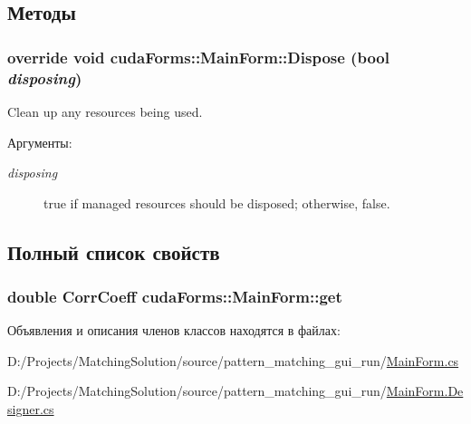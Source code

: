 \subsection{Методы}
\hypertarget{classcuda_forms_1_1_main_form_53bc9d36391d1bf66e486637ea5b954e}{
\subsubsection[{Dispose}]{\setlength{\rightskip}{0pt plus 5cm}override void cudaForms::MainForm::Dispose (bool {\em disposing})}}
\label{classcuda_forms_1_1_main_form_53bc9d36391d1bf66e486637ea5b954e}


Clean up any resources being used. 

\begin{Desc}
\item[Аргументы:]
\begin{description}
\item[{\em disposing}]true if managed resources should be disposed; otherwise, false.\end{description}
\end{Desc}


\subsection{Полный список свойств}
\hypertarget{classcuda_forms_1_1_main_form_0f9ce11f800b8b2cf36bb8ac10e8d248}{
\subsubsection[{get}]{\setlength{\rightskip}{0pt plus 5cm}double CorrCoeff cudaForms::MainForm::get}}
\label{classcuda_forms_1_1_main_form_0f9ce11f800b8b2cf36bb8ac10e8d248}




Объявления и описания членов классов находятся в файлах:\begin{CompactItemize}
\item 
D:/Projects/MatchingSolution/source/pattern\_\-matching\_\-gui\_\-run/\hyperlink{_main_form_8cs}{MainForm.cs}\item 
D:/Projects/MatchingSolution/source/pattern\_\-matching\_\-gui\_\-run/\hyperlink{_main_form_8_designer_8cs}{MainForm.Designer.cs}\end{CompactItemize}

